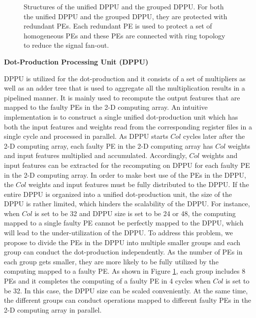 \begin{figure}
    \setlength{\abovecaptionskip}{-10pt}
    \setlength{\belowcaptionskip}{0pt}
            \caption{Structures of the unified DPPU and the grouped DPPU. For both the unified DPPU and the grouped DPPU, they are protected with redundant PEs. Each redundant PE is used to protect a set of homogeneous PEs and these PEs are connected with ring topology to reduce the signal fan-out.}
            \label{fig:deg}
            \vspace{-1em}
\end{figure}

\textbf{Dot-Production Processing Unit (DPPU)}

DPPU is utilized for the dot-production and it consists of a set of multipliers as well as an adder tree that is used to aggregate all the multiplication results in a pipelined manner. It is mainly used to recompute the output features that are mapped to the faulty PEs in the 2-D computing array. An intuitive implementation is to construct a single unified dot-production unit which has both the input features and weights read from the corresponding register files in a single cycle and processed in parallel. As DPPU starts $Col$ cycles later after the 2-D computing array, each faulty PE in the 2-D computing array has $Col$ weights and input features multiplied and accumulated. Accordingly, $Col$ weights and input features can be extracted for the recomputing on DPPU for each faulty PE in the 2-D computing array. In order to make best use of the PEs in the DPPU, the $Col$ weights and input features must be fully distributed to the DPPU. If the entire DPPU is organized into a unified dot-production unit, the size of the DPPU is rather limited, which hinders the scalability of the DPPU. For instance, when $Col$ is set to be 32 and DPPU size is set to be 24 or 48, the computing mapped to a single faulty PE cannot be perfectly mapped to the DPPU, which will lead to the under-utilization of the DPPU. To address this problem, we propose to divide the PEs in the DPPU into multiple smaller groups and each group can conduct the dot-production independently. As the number of PEs in each group gets smaller, they are more likely to be fully utilized by the computing mapped to a faulty PE. As shown in Figure \ref{fig:deg}, each group includes 8 PEs and it completes the computing of a faulty PE in 4 cycles when $Col$ is set to be 32. In this case, the DPPU size can be scaled conveniently. At the same time, the different groups can conduct operations mapped to different faulty PEs in the 2-D computing array in parallel.  

